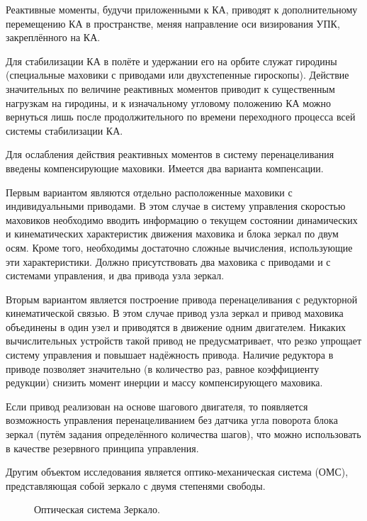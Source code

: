 Реактивные моменты, будучи приложенными к КА, приводят к дополнительному перемещению КА в пространстве, меняя направление оси визирования УПК, закреплённого на КА. 

Для стабилизации КА в полёте и удержании его на орбите служат гиродины (специальные маховики с приводами или двухстепенные гироскопы). Действие значительных по величине реактивных моментов приводит к существенным нагрузкам на гиродины, и к изначальному угловому положению КА можно вернуться лишь после продолжительного по времени переходного процесса всей системы стабилизации КА.

Для ослабления действия реактивных моментов в систему перенацеливания введены компенсирующие маховики. Имеется два варианта компенсации. 

Первым вариантом являются отдельно расположенные маховики с индивидуальными приводами. В этом случае в систему управления скоростью маховиков необходимо вводить информацию о текущем состоянии динамических и кинематических характеристик движения маховика и блока зеркал по двум осям. Кроме того, необходимы достаточно сложные вычисления, использующие эти характеристики. Должно присутствовать два маховика с приводами и с системами управления, и два привода узла зеркал. 

Вторым вариантом является построение привода перенацеливания с редукторной кинематической связью. В этом случае привод узла зеркал и привод маховика объединены в один узел и приводятся в движение одним двигателем. Никаких вычислительных устройств такой привод не предусматривает, что резко упрощает систему управления и повышает надёжность привода. Наличие редуктора в приводе позволяет значительно (в количество раз, равное коэффициенту редукции) снизить момент инерции и массу компенсирующего маховика.

Если привод реализован на основе шагового двигателя, то появляется возможность управления перенацеливанием без датчика угла поворота блока зеркал (путём задания определённого количества шагов), что можно использовать в качестве резервного принципа управления.

Другим объектом исследования является оптико-механическая система (ОМС), представляющая собой зеркало с двумя степенями свободы.

\begin{figure}[ht] 
	\caption{Оптическая система Зеркало.}
	\label{fig:zerkalo} 
\end{figure}

